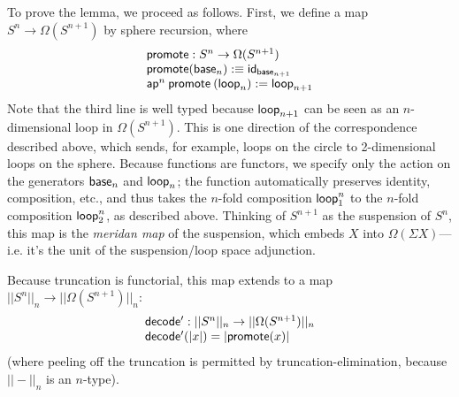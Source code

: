 To prove the lemma, we proceed as follows.  First, we define a map $S^n \to
\Omega(S^{n+1})$ by sphere recursion, where 
\[
\begin{array}{l}
\mathsf{promote} : S^n \to \Omega(S^{n+1}) \\
\mathsf{promote}(\mathsf{base}_n) :\equiv \mathsf{id}_{\mathsf{base}_{n+1}} \\
\mathsf{ap}^n \: \mathsf{promote} \: (\mathsf{loop}_n) := \mathsf{loop}_{n+1}
\end{array}
\]
Note that the third line is well typed because $\mathsf{loop}_{n+1}$ can be seen
as an $n$-dimensional loop in $\Omega(S^{n+1})$.
This is one direction of the correspondence described above, which
sends, for example, loops on the circle to 2-dimensional loops on the
sphere.  Because functions are functors, we specify only the action on
the generators $\mathsf{base}_n$ and $\mathsf{loop}_n$; the function automatically
preserves identity, composition, etc., and thus takes the $n$-fold
composition $\mathsf{loop}_1^n$ to the $n$-fold composition
$\mathsf{loop}_2^n$, as described above.  Thinking of $S^{n+1}$ as the
suspension of $S^n$, this map is the \emph{meridan map} of the
suspension, which embeds $X$ into $\Omega(\Sigma X)$---i.e. it's the unit of
the suspension/loop space adjunction.

Because truncation is functorial, this map extends to a map $||S^n||_n
\to ||\Omega(S^{n+1})||_n$:
\[
\begin{array}{l}
\mathsf{decode'} : ||S^n||_n \to ||\Omega(S^{n+1})||_n \\
\mathsf{decode'}(|x|) = |\mathsf{promote}(x)|
\end{array}
\]
(where peeling off the truncation is permitted by
truncation-elimination, because $||-||_n$ is an $n$-type).

